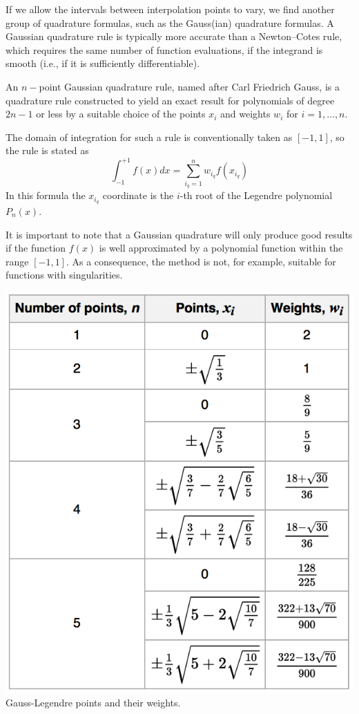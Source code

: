 If we allow the intervals between interpolation points to vary, we find another group of quadrature formulas, such as 
the Gauss(ian) quadrature formulas. 
A Gaussian quadrature rule is typically more accurate than a Newton–Cotes rule, 
which requires the same number of function evaluations, if the integrand is smooth 
(i.e., if it is sufficiently differentiable).


An $n-$point Gaussian quadrature rule, named after Carl Friedrich Gauss, is a quadrature rule constructed
to yield an exact result for polynomials of degree $2n-1$ or less by a suitable choice of the points $x_i$
and weights $w_i$ for $i=1,\dots,n$.

The domain of integration for such a rule is conventionally taken as $[-1,1]$, so the rule is stated as
\[
\int_{-1}^{+1} f(x) dx = \sum_{i_q=1}^n w_{i_q} f(x_{i_q})
\]
In this formula the $x_{i_q}$ coordinate is 
the $i$-th root of the Legendre polynomial $P_n(x)$. 

It is important to note that a Gaussian quadrature will only produce good results if the function $f(x)$
is well approximated by a polynomial function within the range $[-1,1]$.
As a consequence, the method is not, for example, suitable for functions with singularities.

\begin{center}
\includegraphics[width=5.cm]{images/quadrature/gq2}\\
Gauss-Legendre points and their weights.
\end{center}

